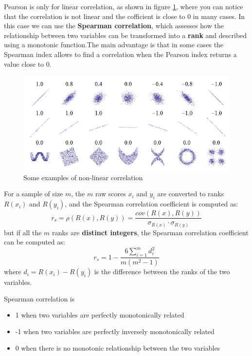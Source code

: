 Pearson is only for linear correlation, as shown in figure
\ref{fig:pearson coff}, where you can notice that the correlation is
not linear and the cofficient is close to 0 in many cases. In this
case we can use the \textbf{Spearman correlation}, which assesses how
the relationship between two variables can be transformed into a
\textbf{rank} and described using a monotonic function.The main
advantage is that in some cases the Spearman index allows to find a
correlation when the Pearson index returns a value close to 0.
\begin{figure}[H]
  \centering
  \includegraphics[scale=0.60]{images/DataExplVis/pearson coff.png}
  \caption{Some examples of non-linear correlation}
  \label{fig:pearson coff}
\end{figure}
For a sample of size $m$, the $m$ raw scores $x_i$ and $y_i$ are
converted to ranks $R(x_i)$ and $R(y_i)$, and the Spearman correlation 
coefficient is computed as:
\begin{equation*}
  r_s = \rho(R(x), R(y)) = \dfrac{cov(R(x), R(y))}{\sigma_{R(x)} \cdot 
  \sigma_{R(y)}}
\end{equation*}
but if all the $m$ ranks are \textbf{distinct integers}, the Spearman
correlation coefficient can be computed as: 
\begin{equation*}
  r_s = 1 - \dfrac{6 \sum_{i=1}^{m} d_i^2}{m(m^2 - 1)}
\end{equation*}
where $d_i = R(x_i) - R(y_i)$ is the difference between the ranks of 
the two variables.

Spearman correlation is 
\begin{itemize}
  \item 1 when two variables are perfectly monotonically related
  \item -1 when two variables are perfectly inversely monotonically
    related
  \item 0 when there is no monotonic relationship between the two
    variables
\end{itemize}

